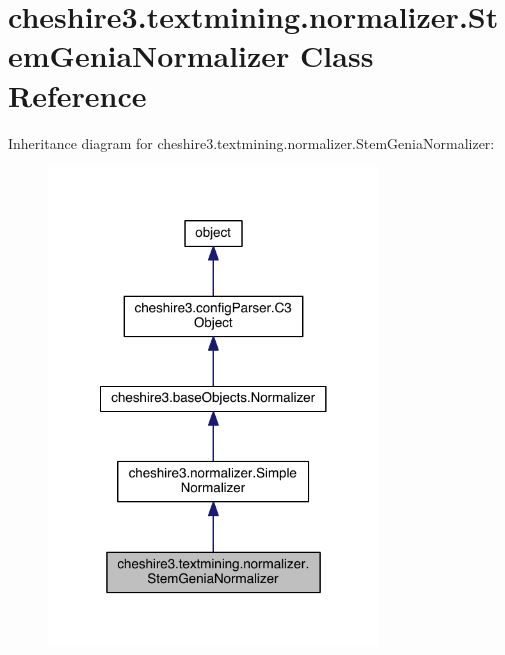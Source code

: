 \hypertarget{classcheshire3_1_1textmining_1_1normalizer_1_1_stem_genia_normalizer}{\section{cheshire3.\-textmining.\-normalizer.\-Stem\-Genia\-Normalizer Class Reference}
\label{classcheshire3_1_1textmining_1_1normalizer_1_1_stem_genia_normalizer}
}


Inheritance diagram for cheshire3.\-textmining.\-normalizer.\-Stem\-Genia\-Normalizer\-:
\nopagebreak
\begin{figure}[H]
\begin{center}
\leavevmode
\includegraphics[width=248pt]{classcheshire3_1_1textmining_1_1normalizer_1_1_stem_genia_normalizer__inherit__graph}
\end{center}
\end{figure}


